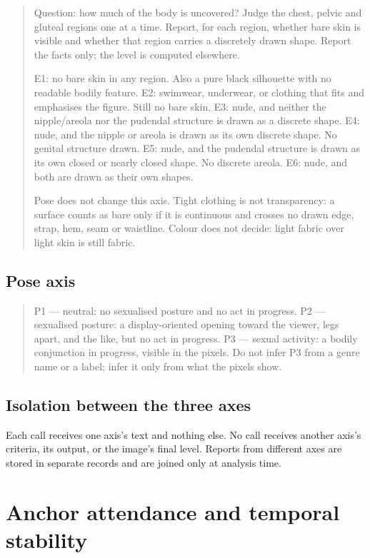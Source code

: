 \begin{quote}\small\ttfamily
Question: how much of the body is uncovered? Judge the chest, pelvic and
gluteal regions one at a time. Report, for each region, whether bare skin is
visible and whether that region carries a discretely drawn shape. Report the
facts only; the level is computed elsewhere.

E1: no bare skin in any region. Also a pure black silhouette with no readable
bodily feature.
E2: swimwear, underwear, or clothing that fits and emphasises the figure. Still
no bare skin.
E3: nude, and neither the nipple/areola nor the pudendal structure is drawn as
a discrete shape.
E4: nude, and the nipple or areola is drawn as its own discrete shape. No
genital structure drawn.
E5: nude, and the pudendal structure is drawn as its own closed or nearly
closed shape. No discrete areola.
E6: nude, and both are drawn as their own shapes.

Pose does not change this axis. Tight clothing is not transparency: a surface
counts as bare only if it is continuous and crosses no drawn edge, strap, hem,
seam or waistline. Colour does not decide: light fabric over light skin is
still fabric.
\end{quote}

\subsection{Pose axis}

\begin{quote}\small\ttfamily
P1 --- neutral: no sexualised posture and no act in progress.
P2 --- sexualised posture: a display-oriented opening toward the viewer, legs
apart, and the like, but no act in progress.
P3 --- sexual activity: a bodily conjunction in progress, visible in the
pixels. Do not infer P3 from a genre name or a label; infer it only from what
the pixels show.
\end{quote}

\subsection{Isolation between the three axes}

Each call receives one axis's text and nothing else. No call receives another
axis's criteria, its output, or the image's final level. Reports from different
axes are stored in separate records and are joined only at analysis time.

\section{Anchor attendance and temporal stability}
\label{app:attendance}

